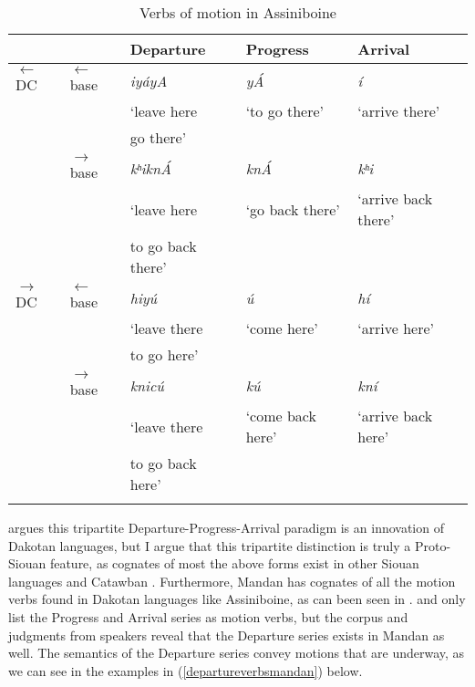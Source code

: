 \begin{table}
\caption{Verbs of motion in Assiniboine \citep[287]{cumberland2005}}\label{assiniboineverbs} 

    \begin{tabular}{lllll}
    \lsptoprule
~&
	~&
	\textbf{Departure}&
	\textbf{Progress}&
	\textbf{Arrival}\\
\midrule
$\leftarrow$DC&
	$\leftarrow$base&
	\textit{iyáyA}&
	\textit{yÁ}&
	\textit{í}\\
~&
	~&
	`leave here&
	`to go there'&
	`arrive there'\\
~&
	~&
	go there'&
	~&
	~\\
\tablevspace
~&
	$\rightarrow$base&
	\textit{kʰiknÁ}&
	\textit{knÁ}&
	\textit{kʰi}\\
~&
	~&
	`leave here&
	`go back there'&
	`arrive back there'\\
~&
	~&
	to go back there'&
	~&
	~\\
\tablevspace
$\rightarrow$DC&
	$\leftarrow$base&
	\textit{hiyú}&
	\textit{ú}&
	\textit{hí}\\
~&
	~&
	`leave there&
	`come here'&
	`arrive here'\\
~&
	~&
	to go here'&
	~&
	~\\
\tablevspace
~&
	$\rightarrow$base&
	\textit{knicú}&
	\textit{kú}&
	\textit{kní}\\
~&
	~&
	`leave there&
	`come back here'&
	`arrive back here'\\
~&
	~&
	to go back here'&
	~&
	~\\

\lspbottomrule
    \end{tabular}
\end{table}

\citet{taylor1976} argues this tripartite Departure-Progress-Arrival paradigm is an innovation of Dakotan languages, but I argue that this tripartite distinction is truly a Proto-Siouan feature, as cognates of most the above forms exist in other Siouan languages and Catawban \citep{kasak2013b}. Furthermore, Mandan has cognates of all the motion verbs found in Dakotan languages like Assiniboine, as can been seen in . \citet{kennard1936} and \citet{hollow1970} only list the Progress and Arrival series as motion verbs, but the corpus and judgments from speakers reveal that the Departure series exists in Mandan as well. The semantics of the Departure series convey motions that are underway, as we can see in the examples in (\ref{departureverbsmandan}) below.

